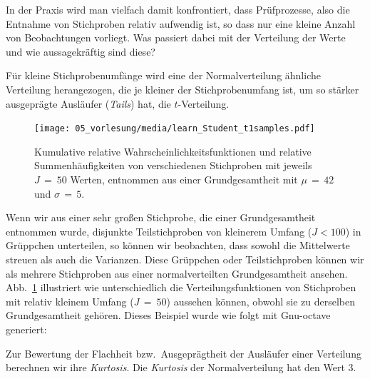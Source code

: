 In der Praxis wird man vielfach damit konfrontiert, dass Prüfprozesse, also die Entnahme von
Stichproben relativ aufwendig ist, so dass nur eine kleine Anzahl von Beobachtungen vorliegt.
Was passiert dabei mit der Verteilung der Werte und wie aussagekräftig sind diese?

Für kleine Stichprobenumfänge wird eine der Normalverteilung ähnliche Verteilung
herangezogen, die je kleiner der Stichprobenumfang ist, um so stärker ausgeprägte
Ausläufer (\textsl{Tails}) hat, die $t$-Verteilung.

\begin{figure}
\begin{center}
\texttt{[image: 05\_vorlesung/media/learn\_Student\_t1samples.pdf]}
\caption{\label{kumulWahrsch} Kumulative relative Wahrscheinlichkeitsfunktionen und relative
Summenhäufigkeiten von verschiedenen Stichproben mit jeweils $J \, = \ 50$ Werten, entnommen aus einer
Grundgesamtheit mit $\mu \, = \, 42$ und $\sigma \, = \, 5$.}
\end{center}
\end{figure}
Wenn wir aus einer sehr großen Stichprobe, die einer Grundgesamtheit entnommen wurde,
disjunkte Teilstichproben von kleinerem Umfang ($J < 100$) in Grüppchen unterteilen, so können wir
beobachten, dass sowohl die Mittelwerte streuen als auch die Varianzen.
Diese Grüppchen oder Teilstichproben können wir als mehrere Stichproben aus einer normalverteilten
Grundgesamtheit ansehen.
Abb.~\ref{kumulWahrsch} illustriert wie unterschiedlich die Verteilungsfunktionen von
Stichproben mit relativ kleinem Umfang ($J \, = \ 50$) aussehen können, obwohl sie zu derselben
Grundgesamtheit gehören. Dieses Beispiel wurde wie folgt mit Gnu-octave generiert:



Zur Bewertung der Flachheit bzw.\ Ausgeprägtheit der Ausläufer einer Verteilung berechnen wir
ihre \textsl{Kurtosis}. Die \textsl{Kurtosis} der Normalverteilung hat den Wert $3$.

